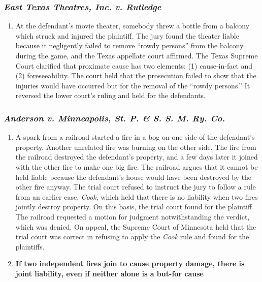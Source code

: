 \subsubsection{\emph{East Texas Theatres, Inc. v. Rutledge}}

\begin{enumerate}
    \item At the defendant's movie theater, somebody threw a bottle from a balcony which struck and injured the plaintiff. The jury found the theater liable because it negligently failed to remove ``rowdy persons'' from the balcony during the game, and the Texas appellate court affirmed. The Texas Supreme Court clarified that proximate cause has two elements: (1) cause-in-fact and (2) foreseeability. The court held that the prosecution failed to show that the injuries would have occurred but for the removal of the ``rowdy persons.'' It reversed the lower court's ruling and held for the defendants.
\end{enumerate}

\subsubsection{\emph{Anderson v. Minneapolis, St. P. \& S. S. M. Ry. Co.}}

\begin{enumerate}
    \item A spark from a railroad started a fire in a bog on one side of the defendant's property. Another unrelated fire was burning on the other side. The fire from the railroad destroyed the defendant's property, and a few days later it joined with the other fire to make one big fire. The railroad argues that it cannot be held liable because the defendant's house would have been destroyed by the other fire anyway. The trial court refused to instruct the jury to follow a rule from an earlier case, \emph{Cook}, which held that there is no liability when two fires jointly destroy property. On this basis, the trial court found for the plaintiff. The railroad requested a motion for judgment notwithstanding the verdict, which was denied. On appeal, the Supreme Court of Minnesota held that the trial court was correct in refusing to apply the \emph{Cook} rule and found for the plaintiffs.
    \item \textbf{If two independent fires join to cause property damage, there is joint liability, even if neither alone is a but-for cause}
\end{enumerate}

